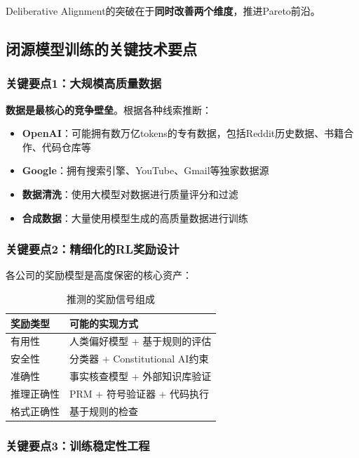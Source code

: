 \documentclass[12pt,a4paper]{article}
\begin{document}
Deliberative Alignment的突破在于\textbf{同时改善两个维度}，推进Pareto前沿。

\subsection{闭源模型训练的关键技术要点}

\subsubsection{关键要点1：大规模高质量数据}

\textbf{数据是最核心的竞争壁垒}。根据各种线索推断：

\begin{itemize}
    \item \textbf{OpenAI}：可能拥有数万亿tokens的专有数据，包括Reddit历史数据、书籍合作、代码仓库等
    \item \textbf{Google}：拥有搜索引擎、YouTube、Gmail等独家数据源
    \item \textbf{数据清洗}：使用大模型对数据进行质量评分和过滤
    \item \textbf{合成数据}：大量使用模型生成的高质量数据进行训练
\end{itemize}

\subsubsection{关键要点2：精细化的RL奖励设计}

各公司的奖励模型是高度保密的核心资产：

\begin{table}[H]
\centering
\caption{推测的奖励信号组成}
\begin{tabular}{ll}
\toprule
\textbf{奖励类型} & \textbf{可能的实现方式} \\
\midrule
有用性 & 人类偏好模型 + 基于规则的评估 \\
安全性 & 分类器 + Constitutional AI约束 \\
准确性 & 事实核查模型 + 外部知识库验证 \\
推理正确性 & PRM + 符号验证器 + 代码执行 \\
格式正确性 & 基于规则的检查 \\
\bottomrule
\end{tabular}
\end{table}

\subsubsection{关键要点3：训练稳定性工程}
\end{document}
